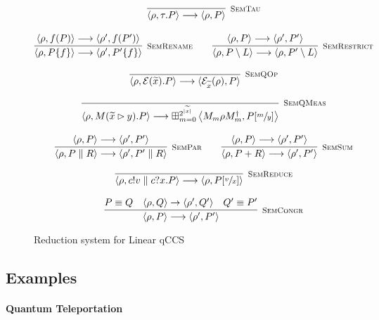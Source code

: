 \begin{figure}[h!]
  \begin{gather*}
    \infer[\mbox{\footnotesize\scshape SemTau}]{\langle \rho, \tau . P \rangle \longrightarrow \langle \rho, P \rangle}{} \\[0.3cm]
    \infer[\mbox{\footnotesize\scshape SemRename}]{\langle \rho, P \{f\} \rangle \longrightarrow \langle \rho', P' \{f\}\rangle}{\langle \rho, f(P) \rangle \longrightarrow \langle \rho', f(P') \rangle} \qquad
    \infer[\mbox{\footnotesize\scshape SemRestrict}]{\langle \rho, P \setminus L \rangle \longrightarrow \langle \rho, P' \setminus L \rangle}{\langle \rho, P \rangle \longrightarrow \langle \rho', P' \rangle} \\[0.3cm]
    \infer[\mbox{\footnotesize\scshape SemQOp}]{\langle \rho, \mathcal{E}(\widetilde{x}) . P \rangle \longrightarrow \langle \mathcal{E}_{\widetilde{x}}(\rho), P \rangle}{} \\[0.3cm]
    \infer[\mbox{\footnotesize\scshape SemQMeas}]{\langle \rho, M(\widetilde{x} \rhd y) . P \rangle \longrightarrow \boxplus_{m = 0}^{2^{|\widetilde{x}|}} \left\langle {M_m \rho M_m^\dag}, P[\sfrac{m}{y}] \right\rangle}{} \\[0.3cm]
    \infer[\mbox{\footnotesize\scshape SemPar}]{\langle \rho, P \parallel R \rangle \longrightarrow \langle \rho', P' \parallel R \rangle}{\langle \rho, P \rangle \longrightarrow \langle \rho', P' \rangle} \qquad
    \infer[\mbox{\footnotesize\scshape SemSum}]{\langle \rho, P + R \rangle \longrightarrow \langle \rho', P' \rangle}{\langle \rho, P \rangle \longrightarrow \langle \rho', P' \rangle} \\[0.3cm]
    \infer[\mbox{\footnotesize\scshape SemReduce}]{\langle \rho, c!v \parallel c?x . P \rangle \longrightarrow \langle \rho, P[\sfrac{v}{x}] \rangle}{} \\[0.3cm]
    \infer[\mbox{\footnotesize\scshape SemCongr}]{\langle \rho, P \rangle \longrightarrow \langle \rho', P' \rangle}
    {P \equiv Q & \confw{\rho, Q} \rightarrow \confw{\rho', Q'} & Q' \equiv P'}
  \end{gather*}
\caption{Reduction system for Linear qCCS}
\label{reduction}
\end{figure}
  
\subsection{Examples}
  \paragraph{Quantum Teleportation}

